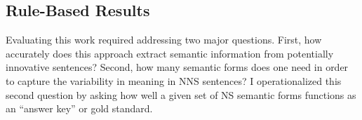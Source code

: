 %
%
%

\subsection{Rule-Based Results}
\label{sec:rule-results}

Evaluating this work required addressing two major questions.  First,
how accurately does this approach extract semantic information from potentially
innovative sentences?
Second, how many semantic forms does one need in order to capture the variability in meaning in NNS sentences? I operationalized this second question by asking how well a given set of NS semantic forms functions as an ``answer key'' or gold standard.

